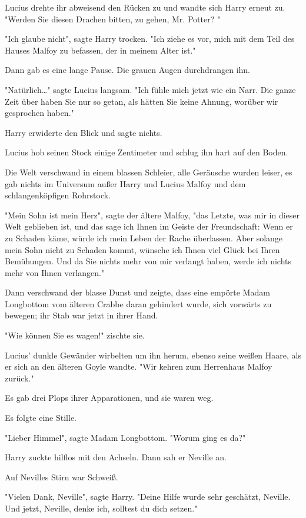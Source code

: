 {Lucius drehte ihr abweisend den Rücken zu und wandte sich Harry erneut zu. "Werden Sie diesen Drachen bitten, zu gehen, Mr. Potter? "

"Ich glaube nicht", sagte Harry trocken. "Ich ziehe es vor, mich mit dem Teil des Hauses Malfoy zu befassen, der in meinem Alter ist."

Dann gab es eine lange Pause. Die grauen Augen durchdrangen ihn.

"Natürlich…" sagte Lucius langsam. "Ich fühle mich jetzt wie ein Narr. Die ganze Zeit über haben Sie nur so getan, als hätten Sie keine Ahnung, worüber wir gesprochen haben."

Harry erwiderte den Blick und sagte nichts.

Lucius hob seinen Stock einige Zentimeter und schlug ihn hart auf den Boden.

Die Welt verschwand in einem blassen Schleier, alle Geräusche wurden leiser, es gab nichts im Universum außer Harry und Lucius Malfoy und dem schlangenköpfigen Rohrstock.

"Mein Sohn ist mein Herz", sagte der ältere Malfoy, "das Letzte, was mir in dieser Welt geblieben ist, und das sage ich Ihnen im Geiste der Freundschaft: Wenn er zu Schaden käme, würde ich mein Leben der Rache überlassen. Aber solange mein Sohn nicht zu Schaden kommt, wünsche ich Ihnen viel Glück bei Ihren Bemühungen. Und da Sie nichts mehr von mir verlangt haben, werde ich nichts mehr von Ihnen verlangen."

Dann verschwand der blasse Dunst und zeigte, dass eine empörte Madam Longbottom vom älteren Crabbe daran gehindert wurde, sich vorwärts zu bewegen; ihr Stab war jetzt in ihrer Hand.

"Wie können Sie es wagen!" zischte sie.

Lucius' dunkle Gewänder wirbelten um ihn herum, ebenso seine weißen Haare, als er sich an den älteren Goyle wandte. "Wir kehren zum Herrenhaus Malfoy zurück."

Es gab drei Plops ihrer Apparationen, und sie waren weg.

Es folgte eine Stille.

"Lieber Himmel", sagte Madam Longbottom. "Worum ging es da?"

Harry zuckte hilflos mit den Achseln. Dann sah er Neville an.

Auf Nevilles Stirn war Schweiß.

"Vielen Dank, Neville", sagte Harry. "Deine Hilfe wurde sehr geschätzt, Neville. Und jetzt, Neville, denke ich, solltest du dich setzen."

}
